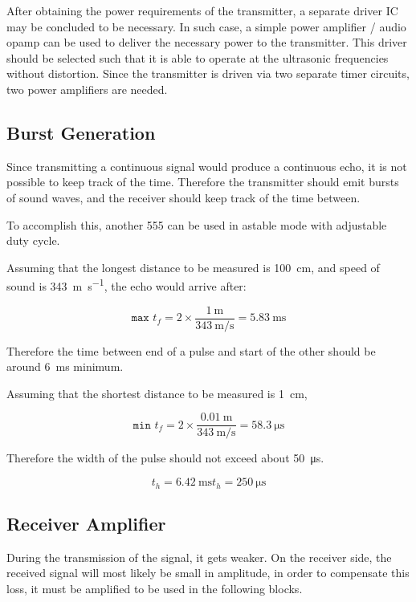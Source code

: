 \documentclass[12pt, a4paper]{article}
\begin{document}
	\bigskip
	After obtaining the power requirements of the transmitter, a separate driver IC may be concluded to be necessary. In such case, a simple power amplifier / audio opamp can be used to deliver the necessary power to the transmitter. This driver should be selected such that it is able to operate at the ultrasonic frequencies without distortion. Since the transmitter is driven via two separate timer circuits, two power amplifiers are needed. 

		\subsection{Burst Generation}
	Since transmitting a continuous signal would produce a continuous echo, it is not possible to keep track of the time. Therefore the transmitter should emit bursts of sound waves, and the receiver should keep track of the time between.
 	
	\bigskip
	To accomplish this, another 555 can be used in astable mode with adjustable duty cycle.
	
	\bigskip
	 Assuming that the longest distance to be measured is \SI{100}{\centi\metre}, and speed of sound is \SI{343}{\metre\per\second}, the echo would arrive after:

    \begin{equation}
        \texttt{max }t_f = 2 \times \frac{\SI{1}{\metre}}{\SI{343}{\metre\per\second}} = \SI{5.83}{\milli\second}
    \end{equation}

    \noindent Therefore the time between end of a pulse and start of the other should be around \SI{6}{\milli\second} minimum. 

    \noindent Assuming that the shortest distance to be measured is \SI{1}{\centi\metre}, 

    \begin{equation}
        \texttt{min }t_f = 2 \times \frac{\SI{0.01}{\metre}}{\SI{343}{\metre\per\second}} = \SI{58.3}{\micro\second}
    \end{equation}

    \noindent Therefore the width of the pulse should not exceed about \SI{50}{\micro\second}.

 \begin{equation}
        \texttt{}t_h = \SI{6.42}{\milli\second}
         \texttt{}t_h = \SI{250}{\micro\second}
    \end{equation}

	
	\subsection{Receiver Amplifier}
	During the transmission of the signal, it gets weaker.  On the receiver side, the received signal will most likely be small in amplitude, in order to compensate this loss, it must be amplified to be used in the following blocks. 
	
\end{document}
